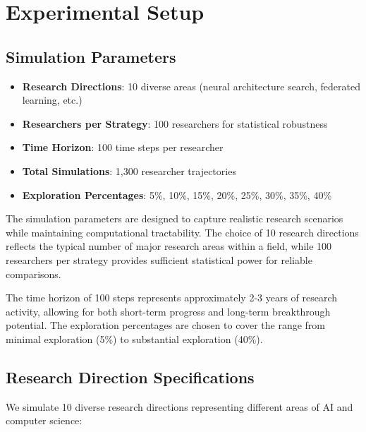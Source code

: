 \documentclass[letterpaper]{article} %
\begin{document}
\section{Experimental Setup}

\subsection{Simulation Parameters}

\begin{itemize}
\item \textbf{Research Directions}: 10 diverse areas (neural architecture search, federated learning, etc.)
\item \textbf{Researchers per Strategy}: 100 researchers for statistical robustness
\item \textbf{Time Horizon}: 100 time steps per researcher
\item \textbf{Total Simulations}: 1,300 researcher trajectories
\item \textbf{Exploration Percentages}: 5\%, 10\%, 15\%, 20\%, 25\%, 30\%, 35\%, 40\%
\end{itemize}

The simulation parameters are designed to capture realistic research scenarios while maintaining computational tractability. The choice of 10 research directions reflects the typical number of major research areas within a field, while 100 researchers per strategy provides sufficient statistical power for reliable comparisons.

The time horizon of 100 steps represents approximately 2-3 years of research activity, allowing for both short-term progress and long-term breakthrough potential. The exploration percentages are chosen to cover the range from minimal exploration (5\%) to substantial exploration (40\%).

\subsection{Research Direction Specifications}

We simulate 10 diverse research directions representing different areas of AI and computer science:
\end{document}
